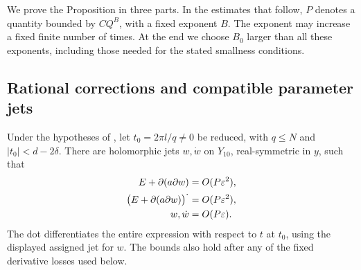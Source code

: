 We prove the Proposition in three parts. In the estimates that follow,
\(P\) denotes a quantity bounded by \(CQ^B\), with a fixed exponent
\(B\). The exponent may increase a fixed finite number of times. At the
end we choose \(B_0\) larger than all these exponents, including those
needed for the stated smallness conditions.

\subsection{Rational corrections and compatible parameter jets}

\begin{lemma}
\label{joint:rational-jets}
Under the hypotheses of , let
\(t_0=2\pi l/q\ne0\) be reduced, with \(q\le N\) and
\(|t_0|<d-2\delta\). There are holomorphic jets \(w,\dot w\) on
\(Y_{10}\), real-symmetric in \(y\), such that
\begin{align}
 E+\partial(a\partial w)&=O(P\varepsilon^2),\notag\\
 \bigl(E+\partial(a\partial w)\bigr)^{\displaystyle\cdot}
       &=O(P\varepsilon^2),\label{joint:rational-compatibility}\\
 w,\dot w&=O(P\varepsilon).\notag
\end{align}
The dot differentiates the entire expression with respect to \(t\) at
\(t_0\), using the displayed assigned jet for \(w\). The bounds also
hold after any of the fixed derivative losses used below.
\end{lemma}

